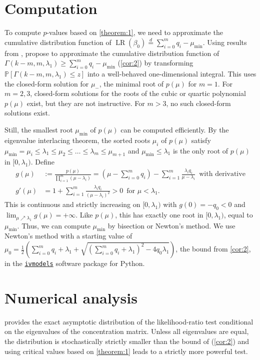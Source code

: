 \documentclass[11pt,hidelinks,a4paper]{article}
\newcommand{\BP}{{\mathbb{P}}}
\DeclareMathOperator{\LR}{LR}
\let\leq\leqslant
\let\geq\geqslant
\begin{document}
\section{Computation}
To compute $p$-values based on \cref{theorem:1}, we need to approximate the cumulative distribution function of $\LR(\beta_0) \overset{d}{=} \sum_{i=0}^m q_i - \mu_\mathrm{min}$.
Using results from \citet{hillier2009conditional}, \citet{londschien2025statistician} propose to approximate the cumulative distribution function of $\Gamma(k - m, m, \lambda_1) \geq \sum_{i=0}^m q_i - \mu_\mathrm{min}$ (\cref{cor:2}) by transforming $\BP[ \Gamma(k - m, m, \lambda_1) \leq z]$ into a well-behaved one-dimensional integral.
This uses the closed-form solution for $\mu_-$, the minimal root of $p(\mu)$ for $m=1$.
For $m=2,3$, closed-form solutions for the roots of the cubic or quartic polynomial $p(\mu)$ exist, but they are not instructive.
For $m>3$, no such closed-form solutions exist.

Still, the smallest root $\mu_\mathrm{min}$ of $p(\mu)$ can be computed efficiently.
By the eigenvalue interlacing theorem, the sorted roots $\mu_i$ of $p(\mu)$ satisfy $\mu_\mathrm{min} = \mu_i \leq \lambda_1 \leq \mu_2 \leq \ldots \leq \lambda_m \leq \mu_{m+1}$ and $\mu_\mathrm{min} \leq \lambda_1$ is the only root of $p(\mu)$ in $[0, \lambda_1)$.
Define
\begin{align*}
    g(\mu) &:= \frac{p(\mu)}{\prod_{i=1}^m (\mu - \lambda_i)} = (\mu - \sum_{i=0}^m q_i) - \sum_{i=1}^m \frac{\lambda_i q_i}{\mu - \lambda_i} \, \text{ with derivative} \\
    g'(\mu) &= 1 + \sum_{i=1}^m \frac{\lambda_i q_i}{(\mu - \lambda_i)^2} > 0 \, \text{ for } \mu < \lambda_1.
\end{align*}
This is continuous and strictly increasing on $[0, \lambda_1)$ with $g(0) = -q_0 < 0$ and $\lim_{\mu \nearrow \lambda_1} g(\mu) = +\infty$.
Like $p(\mu)$, this has exactly one root in $[0, \lambda_1)$, equal to $\mu_\mathrm{min}$.
Thus, we can compute $\mu_\mathrm{min}$ by bisection or Newton's method.
We use Newton's method with a starting value of $\mu_0 = \frac{1}{2}(\sum_{i=0}^m q_i + \lambda_1 + \sqrt{ (\sum_{i=0}^m q_i + \lambda_1)^2 - 4 q_0 \lambda_1} )$, the bound from \cref{cor:2}, in the \href{https://github.com/mlondschien/ivmodels}{\texttt{ivmodels}} software package for Python.

\section{Numerical analysis}
 provides the exact asymptotic distribution of the likelihood-ratio test conditional on the eigenvalues of the concentration matrix.
Unless all eigenvalues are equal, the distribution is stochastically strictly smaller than the bound of \citet{kleibergen2007generalizing} (\cref{cor:2}) and using critical values based on \cref{theorem:1} leads to a strictly more powerful test.
\end{document}
